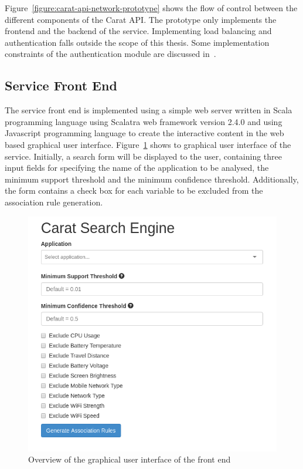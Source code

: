 Figure~\ref{figure:carat-api-network-prototype} shows the flow of control between the different components of the Carat API. The prototype only implements the frontend and the backend of the service. Implementing load balancing and authentication falls outside the scope of this thesis. Some implementation constraints of the authentication module are discussed in~\cite{7840871}.     

\subsection{Service Front End} 

The service front end is implemented using a simple web server written in Scala programming language using Scalatra web framework version 2.4.0 and using Javascript programming language to create the interactive content in the web based graphical user interface. Figure~\ref{figure:frontend-overview} shows to graphical user interface of the service. Initially, a search form will be displayed to the user, containing three input fields for specifying the name of the application to be analysed, the minimum support threshold and the minimum confidence threshold. Additionally, the form contains a check box for each variable to be excluded from the association rule generation. 

\begin{figure} %
	\centering
	\includegraphics[width=\textwidth]{images/frontend/frontend_overview.png}
	\caption{Overview of the graphical user interface of the front end}
	\label{figure:frontend-overview}
\end{figure} 

